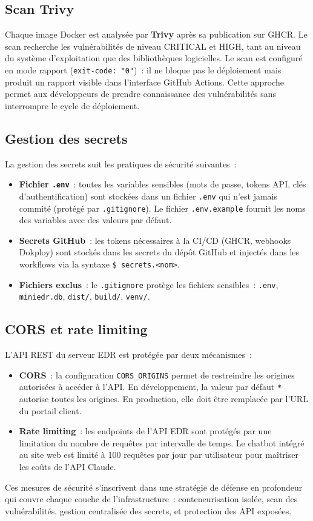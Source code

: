 \subsection{Scan Trivy}

Chaque image Docker est analysée par \textbf{Trivy} après sa publication sur
GHCR. Le scan recherche les vulnérabilités de niveau CRITICAL et HIGH, tant au
niveau du système d'exploitation que des bibliothèques logicielles. Le scan est
configuré en mode rapport (\texttt{exit-code: "0"})~: il ne bloque pas le
déploiement mais produit un rapport visible dans l'interface GitHub Actions.
Cette approche permet aux développeurs de prendre connaissance des
vulnérabilités sans interrompre le cycle de déploiement.

\subsection{Gestion des secrets}

La gestion des secrets suit les pratiques de sécurité suivantes~:

\begin{itemize}
  \item \textbf{Fichier \texttt{.env}}~: toutes les variables sensibles (mots
    de passe, tokens API, clés d'authentification) sont stockées dans un
    fichier \texttt{.env} qui n'est jamais commité (protégé par
    \texttt{.gitignore}). Le fichier \texttt{.env.example} fournit les noms des
    variables avec des valeurs par défaut.
  \item \textbf{Secrets GitHub}~: les tokens nécessaires à la CI/CD (GHCR,
    webhooks Dokploy) sont stockés dans les secrets du dépôt GitHub et injectés
    dans les workflows via la syntaxe \texttt{\${{ secrets.\textless{}nom\textgreater{}}}}.
  \item \textbf{Fichiers exclus}~: le \texttt{.gitignore} protège les fichiers
    sensibles~: \texttt{.env}, \texttt{miniedr.db}, \texttt{dist/},
    \texttt{build/}, \texttt{venv/}.
\end{itemize}

\subsection{CORS et rate limiting}

L'API REST du serveur EDR est protégée par deux mécanismes~:

\begin{itemize}
  \item \textbf{CORS}~: la configuration \texttt{CORS\_ORIGINS} permet de
    restreindre les origines autorisées à accéder à l'API. En développement,
    la valeur par défaut \texttt{*} autorise toutes les origines. En
    production, elle doit être remplacée par l'URL du portail client.
  \item \textbf{Rate limiting}~: les endpoints de l'API EDR sont protégés par
    une limitation du nombre de requêtes par intervalle de temps. Le chatbot
    intégré au site web est limité à 100 requêtes par jour par utilisateur pour
    maîtriser les coûts de l'API Claude.
\end{itemize}

Ces mesures de sécurité s'inscrivent dans une stratégie de défense en
profondeur qui couvre chaque couche de l'infrastructure~: conteneurisation
isolée, scan des vulnérabilités, gestion centralisée des secrets, et
protection des API exposées.
